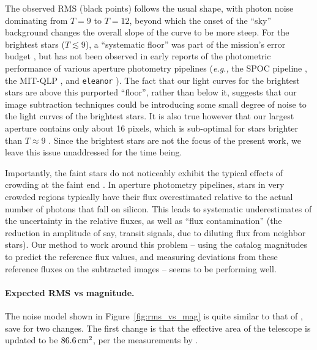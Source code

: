 \documentclass[12pt,twocolumn,tighten]{aastex62}
\begin{document}
The observed RMS (black points) follows the usual shape, with photon
noise dominating from $T=9$ to $T=12$, beyond which the onset of the
``sky'' background changes the overall slope of the curve to be more
steep.  For the brightest stars ($T\lesssim 9$), a ``systematic
floor'' was part of the mission's error budget
\citep{ricker_transiting_2015}, but has not been observed in early
reports of the photometric performance of various aperture photometry
pipelines ({\it e.g.,} the SPOC pipeline \citealt{jenkins_spoc_2010},
the MIT-QLP \citealt{huang_tess_2018}, and \texttt{eleanor}
\citealt{feinstein_eleanor_2019}).  The fact that our light curves for
the brightest stars are above this purported ``floor'', rather than
below it, suggests that our image subtraction techniques could be
introducing some small degree of noise to the light curves of the
brightest stars.  It is also true however that our largest aperture
contains only about 16 pixels, which is sub-optimal for stars brighter
than $T\approx9$ \citep[see][Figure~14]{Sullivan_et_al_2015}.  Since
the brightest stars are not the focus of the present work, we leave
this issue unaddressed for the time being.

Importantly, the faint stars do not noticeably exhibit
the typical effects of crowding at the faint end 
\citep[{\it e.g.},][Figure~5]{feinstein_eleanor_2019}.
In aperture photometry pipelines, stars in very crowded regions typically 
have their flux overestimated relative to the actual number of photons
that fall on silicon.
This leads to systematic underestimates of the uncertainty in the relative 
fluxes, as well as ``flux contamination'' (the reduction in amplitude of say, 
transit signals, due to diluting flux from neighbor stars).
Our method to work around this problem -- using the catalog magnitudes to 
predict the reference flux values, and measuring deviations from these 
reference fluxes on the subtracted images -- seems to be performing well.


\paragraph{Expected RMS vs magnitude.}

The noise model shown in Figure~\ref{fig:rms_vs_mag} is quite similar
to that of \citet{Sullivan_et_al_2015}, save for two changes.
The first change is that the effective area of the telescope is
updated to be $86.6\,{\rm cm}^2$, per the measurements by
\citet{vanderspek_2018}.
\end{document}
